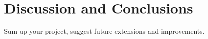 \chapter{Discussion and Conclusions}
Sum up your project, suggest future extensions and improvements.
